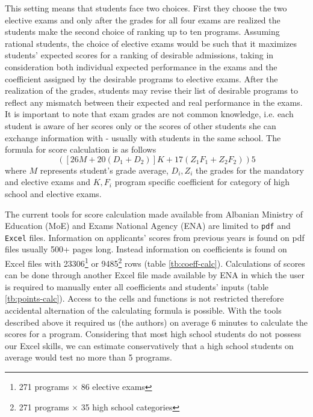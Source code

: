 \documentclass{article}
\begin{document}
This setting means that students face two choices. First they choose the two elective exams and only after the grades for all four exams are realized the students make the second choice of ranking up to ten programs. Assuming rational students, the choice of elective exams would be such that it maximizes students' expected scores for a ranking of desirable admissions, taking in consideration both individual expected performance in the exams and the coefficient assigned by the desirable programs to elective exams. After the realization of the grades, students may revise their list of desirable programs to reflect any mismatch between their expected and real performance in the exams. It is important to note that exam grades are not common knowledge, i.e. each student is aware of her scores only or the scores of other students she can exchange information with - usually with students in the same school. The formula for score calculation is as follows
$$ ([26M + 20(D_1+D_2)]K + 17 (Z_1F_1+Z_2F_2))5 $$
where $M$ represents student's grade average, $D_i, Z_i$ the grades for the mandatory and elective exams and $K, F_i$ program specific coefficient for category of high school and elective exams.

The current tools for score calculation made available from Albanian Ministry of Education (MoE) and Exams National Agency (ENA) are limited to \texttt{pdf} and \texttt{Excel} files. Information on applicants' scores from previous years is found on pdf files usually 500+ pages long. Instead information on coefficients is found on Excel files with 23306\footnote{271 programs $\times$ 86 elective exams} or 9485\footnote{271 programs $\times$ 35 high school categories} rows (table \ref{tb:coeff-calc}). Calculations of scores can be done through another Excel file made available by ENA in which the user is required to manually enter all coefficients and students' inputs (table \ref{tb:points-calc}). Access to the cells and functions is not restricted therefore accidental alternation of the calculating formula is possible. With the tools described above it required us (the authors) on average 6 minutes to calculate the scores for a program. Considering that most high school students do not possess our Excel skills, we can estimate conservatively that a high school students on average would test no more than 5 programs.
\end{document}
